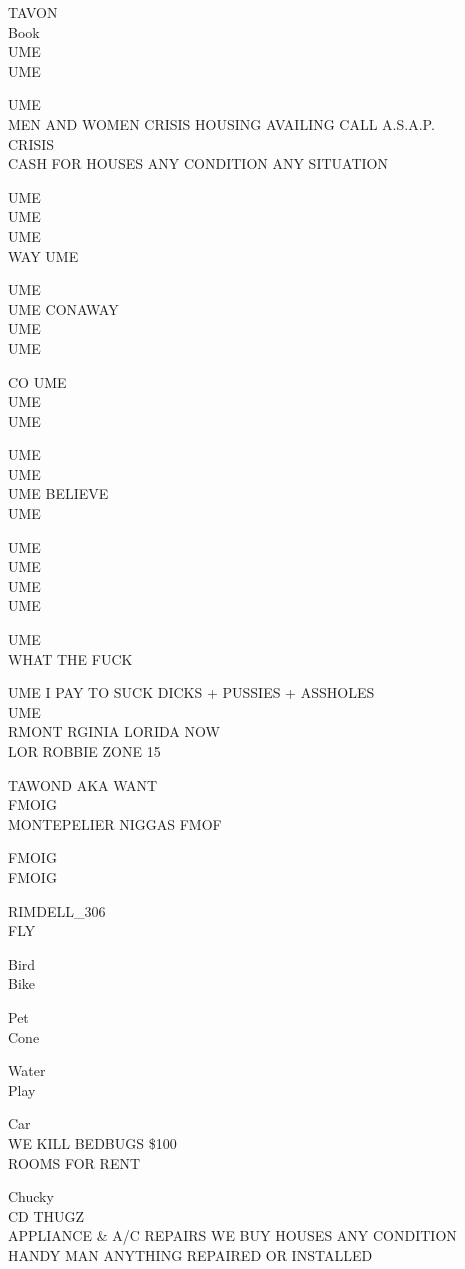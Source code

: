 \documentclass[10pt,letterpaper]{article}
\begin{document}
TAVON\\
Book\\
UME\\
UME

UME\\
MEN AND WOMEN CRISIS HOUSING AVAILING CALL A.S.A.P.\\
CRISIS\\
CASH FOR HOUSES ANY CONDITION ANY SITUATION

UME\\
UME\\
UME\\
WAY UME

UME\\
UME CONAWAY\\
UME\\
UME

CO UME\\
UME\\
UME

UME\\
UME\\
UME BELIEVE\\
UME

UME\\
UME\\
UME\\
UME

UME\\
WHAT THE FUCK

UME I PAY TO SUCK DICKS + PUSSIES + ASSHOLES\\
UME\\
RMONT RGINIA LORIDA NOW\\
LOR ROBBIE ZONE 15

TAWOND AKA WANT\\
FMOIG\\
MONTEPELIER NIGGAS FMOF

FMOIG\\
FMOIG

RIMDELL\_306\\
FLY

Bird\\
Bike

Pet\\
Cone

Water\\
Play

Car\\
WE KILL BEDBUGS \$100\\
ROOMS FOR RENT

Chucky\\
CD THUGZ\\
APPLIANCE \& A/C REPAIRS WE BUY HOUSES ANY CONDITION\\
HANDY MAN ANYTHING REPAIRED OR INSTALLED
\end{document}
